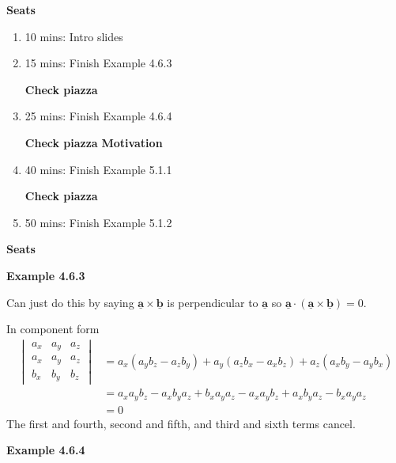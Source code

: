\textbf{Seats}
\begin{enumerate}
    \item 10 mins: Intro slides \par
    \item 15 mins: Finish Example 4.6.3 \par
    \textbf{Check piazza}
    \item 25 mins: Finish Example 4.6.4 \par
    \textbf{Check piazza}
    \textbf{Motivation}
    \item 40 mins: Finish Example 5.1.1 \par
    \textbf{Check piazza}
    \item 50 mins: Finish Example 5.1.2 \par
\end{enumerate}
\textbf{Seats}

\newcommand{\vect}[1]{\underline{\mathbf{#1}}}

\vspace{5mm} 

\textbf{Example 4.6.3} \par

Can just do this by saying $\vect{a}\times\vect{b}$ is perpendicular to $\vect{a}$ so $\vect{a}\cdot(\vect{a}\times\vect{b}) = 0$.

In component form
\begin{align*}
\begin{vmatrix}
    a_x & a_y & a_z\\
    a_x & a_y & a_z \\
    b_x & b_y & b_z
\end{vmatrix} &= a_x(a_y b_z - a_z b_y) + a_y(a_z b_x - a_x b_z) + a_z (a_x b_y - a_y b_x) \\
&= a_x a_y b_z - a_x b_y a_z + b_x a_y a_z - a_x a_y b_z + a_x b_y a_z - b_x a_y a_z\\
&= 0
\end{align*}
The first and fourth, second and fifth, and third and sixth terms cancel.

\textbf{Example 4.6.4} \par

